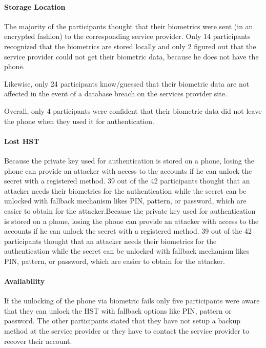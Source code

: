\documentclass[runningheads]{llncs}
\begin{document}
\paragraph{Storage Location}
The majority of the participants thought that their biometrics were sent (in an encrypted fashion) to the corresponding service provider. Only 14 participants recognized that the biometrics are stored locally and only 2 figured out that the service provider could not get their biometric data, because he does not have the phone.

Likewise, only 24 participants know/guessed that their biometric data are not affected in the event of a database breach on the services provider site.

Overall, only 4 participants were confident that their biometric data did not leave the phone when they used it for authentication.

\paragraph{Lost HST}
Because the private key used for authentication is stored on a phone, losing the phone can provide an attacker with access to the accounts if he can unlock the secret with a registered method. 39 out of the 42 participants thought that an attacker needs their biometrics for the authentication while the secret can be unlocked with fallback mechanism likes PIN, pattern, or password, which are easier to obtain for the attacker.Because the private key used for authentication is stored on a phone, losing the phone can provide an attacker with access to the accounts if he can unlock the secret with a registered method. 39 out of the 42 participants thought that an attacker needs their biometrics for the authentication while the secret can be unlocked with fallback mechanism likes PIN, pattern, or password, which are easier to obtain for the attacker.

\paragraph{Availability}
If the unlocking of the phone via biometric fails only five participants were aware that they can unlock the HST with fallback options like PIN, pattern or password. The other participants stated that they have not setup a backup method at the service provider or they have to contact the service provider to recover their account.
\end{document}

